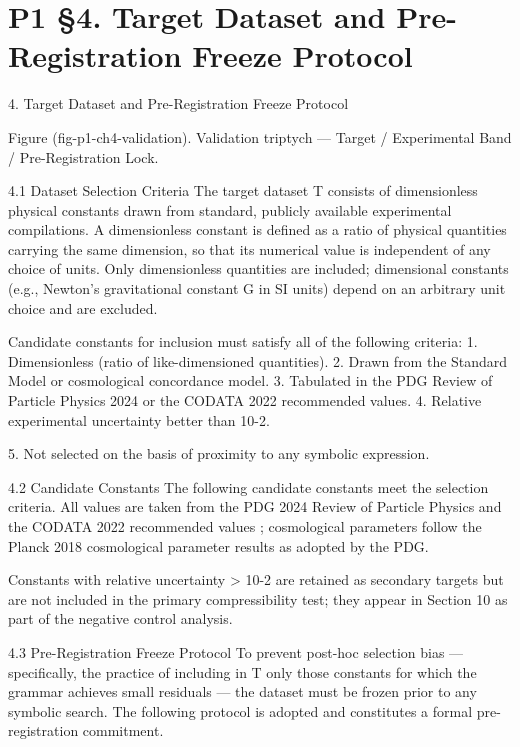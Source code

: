
\section{P1 §4. Target Dataset and Pre-Registration Freeze Protocol}

4. Target Dataset and Pre-Registration Freeze Protocol

                   Figure (fig-p1-ch4-validation). Validation triptych --- Target / Experimental Band /
                                                 Pre-Registration Lock.

  4.1 Dataset Selection Criteria
  The target dataset T consists of dimensionless physical constants drawn from standard,
  publicly available experimental compilations. A dimensionless constant is defined as a
  ratio of physical quantities carrying the same dimension, so that its numerical value is
  independent of any choice of units. Only dimensionless quantities are included;
  dimensional constants (e.g., Newton's gravitational constant G in SI units) depend on
  an arbitrary unit choice and are excluded.

  Candidate constants for inclusion must satisfy all of the following criteria:
  1. Dimensionless (ratio of like-dimensioned quantities).
  2. Drawn from the Standard Model or cosmological concordance model.
  3. Tabulated in the PDG Review of Particle Physics 2024 \citep{pdg2024} or the CODATA 2022 \citep{codata2022}
  recommended values.
  4. Relative experimental uncertainty better than 10-2.

  5. Not selected on the basis of proximity to any symbolic expression.

  4.2 Candidate Constants
  The following candidate constants meet the selection criteria. All values are taken from
  the PDG 2024 Review of Particle Physics \citep{pdg2024} and the CODATA 2022 recommended values \citep{codata2022};
  cosmological parameters follow the Planck 2018 cosmological parameter results \citep{planck2018vi} as
  adopted by the PDG.

  Constants with relative uncertainty > 10-2 are retained as secondary targets but are
  not included in the primary compressibility test; they appear in Section 10 as part of
  the negative control analysis.

  4.3 Pre-Registration Freeze Protocol
  To prevent post-hoc selection bias --- specifically, the practice of including in T only
  those constants for which the grammar achieves small residuals --- the dataset must be
  frozen prior to any symbolic search. The following protocol is adopted and constitutes a
  formal pre-registration commitment.

